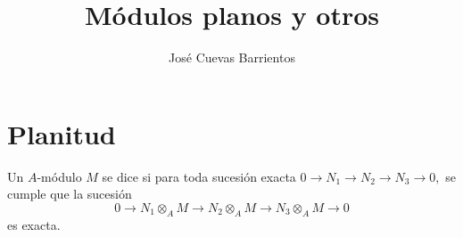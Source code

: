 \documentclass[11pt, reqno]{amsart}
\title{Módulos planos y otros}
\date{\DTMdate{2025-06-05}}
\author{José Cuevas Barrientos}
\begin{document}
\maketitle

\nocite{atiyah:commutative}
\nocite{jacobson:basic}

\section{Planitud}
Un $A$-módulo $M$ se dice  si para toda sucesión exacta $0 \to N_1 \to N_2 \to N_3
\to 0,$ se cumple que la sucesión
\begin{equation}
	0 \to N_1\otimes_A M \to N_2\otimes_A M \to N_3\otimes_A M \to 0
	\label{cd:flat_exact}
\end{equation}
es exacta.
\end{document}
